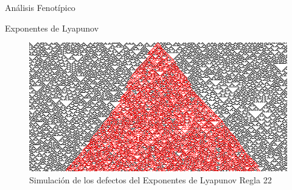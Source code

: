 \documentclass[12pt, letterpaper]{article}
\renewcommand{\rule}{Regla 22}
\begin{document}
\begin{section}{Análisis Fenotípico}
\begin{subsection}{Exponentes de Lyapunov}
\begin{figure}[H]
    \includegraphics[max width=200mm ,max height=200 mm , keepaspectratio ]{SimDefects.png} 
    \caption{Simulación de los defectos del Exponentes de Lyapunov \rule} 
    \end{figure} 
    \end{subsection} 
    \begin{table}[H] 
    \centering 
    \begin{tabular}{cc} 

\end{tabular}
\end{table}
\end{section}
\end{document}
